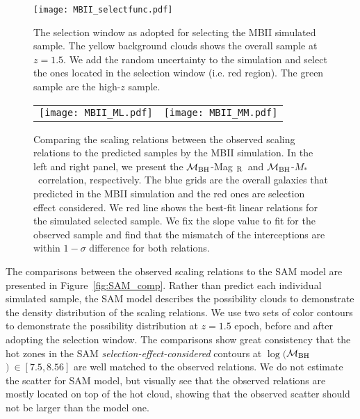 \documentclass{natureprintstyle}
\newcommand{\mbh}{$\mathcal M_{\rm BH}$}
\newcommand{\mr}{Mag$_{\rm ~R}$}
\newcommand{\mstar}{{$M_*$}}
\begin{document}
\begin{figure}[t]
\texttt{[image: MBII\_selectfunc.pdf]}
\caption{The selection window as adopted for selecting the MBII simulated sample. The yellow background clouds shows the overall sample at $z=1.5$. We add the random uncertainty to the simulation and select the ones located in the selection window (i.e. red region). The green sample are the high-$z$ sample.}
\label{fig:selectfunc}
\end{figure}

\begin{figure*}[t]%
\begin{tabular}{c c}
\texttt{[image: MBII\_ML.pdf]} &
\texttt{[image: MBII\_MM.pdf]} \\
\end{tabular}
\caption{
Comparing the scaling relations between the observed scaling relations to the predicted samples by the MBII simulation. In the left and right panel, we present the \mbh-\mr\ and \mbh-\mstar\ correlation, respectively. The blue grids are the overall galaxies that predicted in the MBII simulation and the red ones are selection effect considered. We red line shows the best-fit linear relations for the simulated selected sample. We fix the slope value to fit for the observed sample and find that the mismatch of the interceptions are within $1-\sigma$ difference for both relations. %
}
\label{fig:MBII_comp}
\end{figure*}

The comparisons between the observed scaling relations to the SAM model are presented in Figure~\ref{fig:SAM_comp}. Rather than predict each individual simulated sample, the SAM model describes the possibility clouds to demonstrate the density distribution of the scaling relations. We use two sets of color contours to demonstrate the possibility distribution at $z=1.5$ epoch, before and after adopting the selection window. The comparisons show great consistency that the hot zones in the SAM {\it selection-effect-considered} contours at $\log($\mbh$)~\in[7.5, 8.56]$ are well matched to the observed relations. We do not estimate the scatter for SAM model, but visually see that the observed relations are mostly located on top of the hot cloud, showing that the observed scatter should not be larger than the model one.
\end{document}
